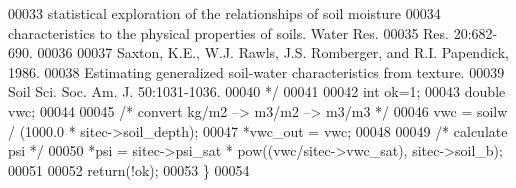 \begin{DoxyCode}
00033 \textcolor{comment}{       statistical exploration of the relationships of soil moisture      }
00034 \textcolor{comment}{       characteristics to the physical properties of soils.  Water Res.}
00035 \textcolor{comment}{       Res. 20:682-690.}
00036 \textcolor{comment}{    }
00037 \textcolor{comment}{    Saxton, K.E., W.J. Rawls, J.S. Romberger, and R.I. Papendick, 1986.}
00038 \textcolor{comment}{        Estimating generalized soil-water characteristics from texture.}
00039 \textcolor{comment}{        Soil Sci. Soc. Am. J. 50:1031-1036.}
00040 \textcolor{comment}{    */}
00041 
00042     \textcolor{keywordtype}{int} ok=1;
00043     \textcolor{keywordtype}{double} vwc;
00044 
00045     \textcolor{comment}{/* convert kg/m2 --> m3/m2 --> m3/m3 */}
00046     vwc = soilw / (1000.0 * sitec->soil\_depth);
00047     *vwc\_out = vwc;
00048 
00049     \textcolor{comment}{/* calculate psi */}
00050     *psi = sitec->psi\_sat * pow((vwc/sitec->vwc\_sat), sitec->soil\_b);
00051 
00052     \textcolor{keywordflow}{return}(!ok);
00053 \}
00054 
\end{DoxyCode}
